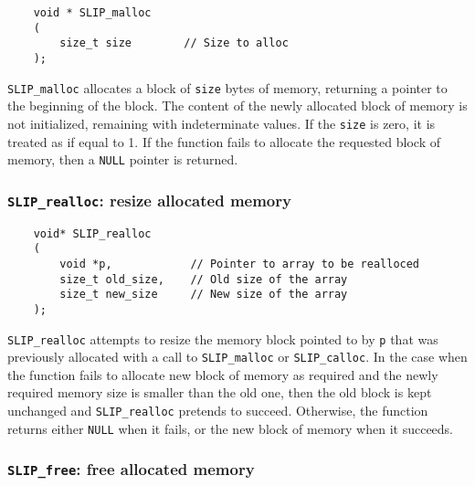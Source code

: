 \documentclass[11pt]{article}
\theoremstyle{definition}
\begin{document}
\begin{mdframed}[userdefinedwidth=6in]
{\footnotesize
\begin{verbatim}
    void * SLIP_malloc
    (
        size_t size        // Size to alloc
    );
\end{verbatim}
} \end{mdframed}

\verb|SLIP_malloc| allocates a block of \verb|size| bytes of memory, returning
a pointer to the beginning of the block. The content of the newly allocated
block of memory is not initialized, remaining with indeterminate values.  If
the \verb|size| is zero, it is treated as if equal to 1.  If the function fails
to allocate the requested block of memory, then a \verb|NULL| pointer is
returned.

\cprotect\subsubsection{\verb|SLIP_realloc|: resize allocated memory}
\label{ss:SLIP_realloc}

\begin{mdframed}[userdefinedwidth=6in]
{\footnotesize
\begin{verbatim}
    void* SLIP_realloc
    (
        void *p,            // Pointer to array to be realloced
        size_t old_size,    // Old size of the array
        size_t new_size     // New size of the array
    );
\end{verbatim}
} \end{mdframed}

\verb|SLIP_realloc| attempts to resize the memory block pointed to by \verb|p|
that was previously allocated with a call to \verb|SLIP_malloc| or
\verb|SLIP_calloc|. In the case when the function fails to allocate new block
of memory as required and the newly required memory size is smaller than the
old one, then the old block is kept unchanged and \verb|SLIP_realloc| pretends
to succeed. Otherwise, the function returns either \verb|NULL| when it fails,
or the new block of memory when it succeeds.

\cprotect\subsubsection{\verb|SLIP_free|: free allocated memory}
\label{ss:SLIP_free}
\end{document}
